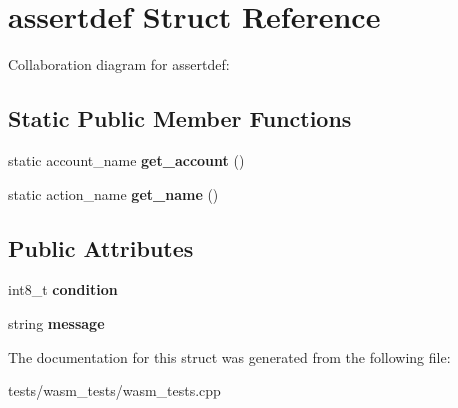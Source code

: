 \hypertarget{structassertdef}{}\section{assertdef Struct Reference}
\label{structassertdef}


Collaboration diagram for assertdef\+:
\subsection*{Static Public Member Functions}
\begin{DoxyCompactItemize}
\item 
\mbox{\label{structassertdef_ae4288ac92cfa9eefa850c7c32fa9e2bc}} 
static account\+\_\+name {\bfseries get\+\_\+account} ()
\item 
\mbox{\label{structassertdef_aa6dac93478444d18e7725dd7582b37bb}} 
static action\+\_\+name {\bfseries get\+\_\+name} ()
\end{DoxyCompactItemize}
\subsection*{Public Attributes}
\begin{DoxyCompactItemize}
\item 
\mbox{\label{structassertdef_a55cb671bdf639bfb98ee12b3f19a37e1}} 
int8\+\_\+t {\bfseries condition}
\item 
\mbox{\label{structassertdef_a315182647b3b9f96b5d473fd25a7c916}} 
string {\bfseries message}
\end{DoxyCompactItemize}


The documentation for this struct was generated from the following file\+:\begin{DoxyCompactItemize}
\item 
tests/wasm\+\_\+tests/wasm\+\_\+tests.\+cpp\end{DoxyCompactItemize}
